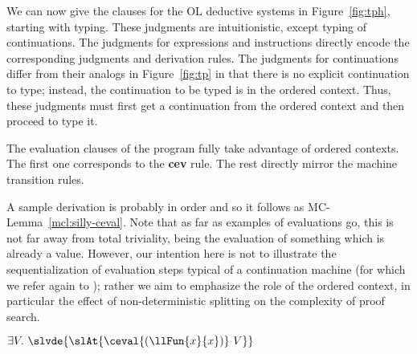 \documentclass[final]{svjour3}
\begin{document}
We can now give the clauses for the OL deductive systems in
Figure~\ref{fig:tph}, starting with typing.  These judgments are
intuitionistic, except typing of continuations.  The judgments for
expressions and instructions directly encode the corresponding
judgments and derivation rules.  The judgments for continuations
differ from their analogs in Figure~\ref{fig:tp} in that there is no
explicit continuation to type; instead, the continuation to be
typed is in the ordered context. Thus, these judgments must first get
a continuation from the ordered context and then proceed to type it.
  
The evaluation clauses of the program fully take advantage of ordered
contexts.  The first one corresponds to the \textbf{cev}
rule.  The rest directly mirror the machine transition
rules. 




A sample derivation is probably in order and so it follows as
MC-Lemma~\ref{mcl:silly-ceval}.  Note that as far as examples of
evaluations go, this is not far away from total triviality, being the
evaluation of something which is already a value. However, our
intention here is not to illustrate the sequentialization of
evaluation steps typical of a continuation machine (for which we refer
again to \cite{Pfenning01book}); rather we aim to emphasize the role of the
ordered context, in particular the effect of non-deterministic
splitting on the complexity of proof search.



\begin{mclemma}
\label{mcl:silly-ceval}
 $\exists V.\ \slvde{\slAt{\ceval{(\llFun{x}{x})} \ V}} $
\end{mclemma}
\end{document}
